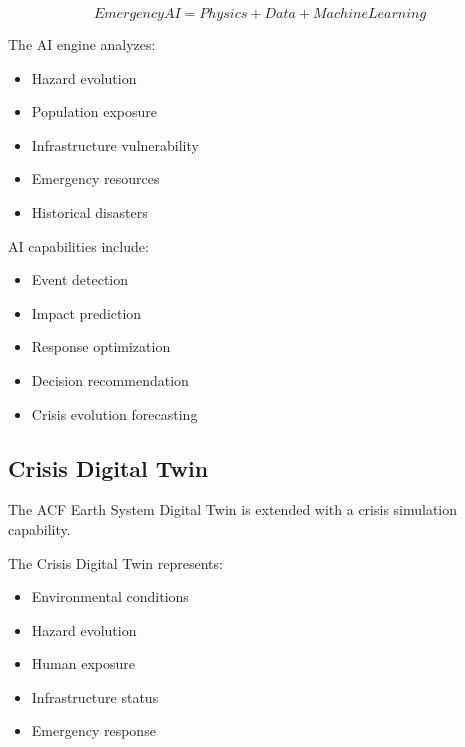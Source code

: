 \[
EmergencyAI
=
Physics
+
Data
+
MachineLearning
\]


The AI engine analyzes:

\begin{itemize}

\item Hazard evolution

\item Population exposure

\item Infrastructure vulnerability

\item Emergency resources

\item Historical disasters

\end{itemize}


AI capabilities include:

\begin{itemize}

\item Event detection

\item Impact prediction

\item Response optimization

\item Decision recommendation

\item Crisis evolution forecasting

\end{itemize}



\subsection{Crisis Digital Twin}

The ACF Earth System Digital Twin is extended with a crisis simulation
capability.

The Crisis Digital Twin represents:

\begin{itemize}

\item Environmental conditions

\item Hazard evolution

\item Human exposure

\item Infrastructure status

\item Emergency response

\end{itemize}


